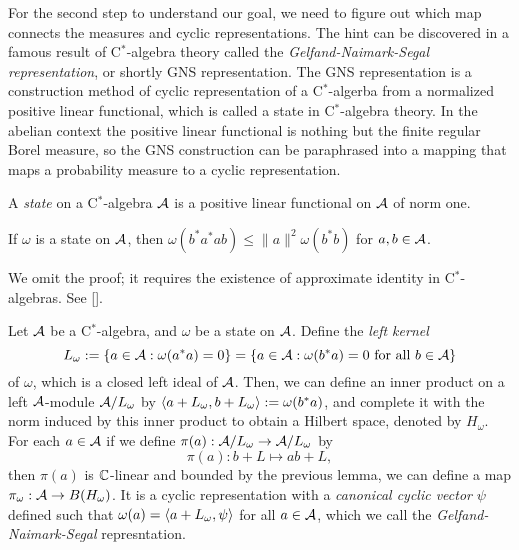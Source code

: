 \documentclass[a4paper]{article}
\begin{document}
For the second step to understand our goal, we need to figure out which map connects the measures and cyclic representations.
The hint can be discovered in a famous result of C$^*$-algebra theory called the \emph{Gelfand-Naimark-Segal representation}, or shortly GNS representation.
The GNS representation is a construction method of cyclic representation of a C$^*$-algerba from a normalized positive linear functional, which is called a state in C$^*$-algebra theory.
In the abelian context the positive linear functional is nothing but the finite regular Borel measure, so the GNS construction can be paraphrased into a mapping that maps a probability measure to a cyclic representation.

\begin{defn}[State]
A \emph{state} on a C$^*$-algebra $\mathcal{A}$ is a positive linear functional on $\mathcal{A}$ of norm one.
\end{defn}
\begin{lem}
If $\omega$ is a state on $\mathcal{A}$, then $\omega(b^*a^*ab)\le\|a\|^2\omega(b^*b)$ for $a,b\in\mathcal{A}$.
\end{lem}
\begin{pf}
We omit the proof; it requires the existence of approximate identity in C$^*$-algebras.
See [].
\end{pf}
\begin{defn}
Let $\mathcal{A}$ be a C$^*$-algebra, and $\omega$ be a state on $\mathcal{A}$.
Define the \emph{left kernel}
\[L_\omega:=\{a\in\mathcal{A}:\omega(a^*a)=0\}=\{a\in\mathcal{A}:\omega(b^*a)=0\text{ for all }b\in\mathcal{A}\}\]
of $\omega$, which is a closed left ideal of $\mathcal{A}$.
Then, we can define an inner product on a left $\mathcal{A}$-module $\mathcal{A}/L_\omega$ by $\langle a+L_\omega,b+L_\omega\rangle:=\omega(b^*a)$, and complete it with the norm induced by this inner product to obtain a Hilbert space, denoted by $H_\omega$.
For each $a\in\mathcal{A}$ if we define $\pi(a):\mathcal{A}/L_\omega\to\mathcal{A}/L_\omega$ by
\[\pi(a):b+L\mapsto ab+L,\]
then $\pi(a)$ is $\mathbb{C}$-linear and bounded by the previous lemma, we can define a map $\pi_\omega:\mathcal{A}\to B(H_\omega)$.
It is a cyclic representation with a \emph{canonical cyclic vector} $\psi$ defined such that $\omega(a)=\langle a+L_\omega,\psi\rangle$ for all $a\in\mathcal{A}$, which we call the \emph{Gelfand-Naimark-Segal} represntation.
\end{defn}
\end{document}
